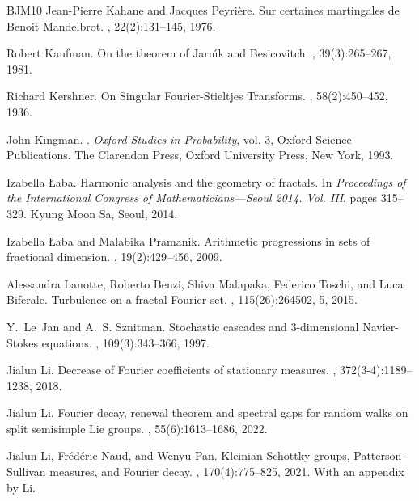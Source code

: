 \documentclass[12pt]{amsart}
\theoremstyle{definition}
\theoremstyle{remark}
\numberwithin{equation}{section}
\begin{document}
\begin{thebibliography}{BJM10}
	Jean-Pierre Kahane and Jacques Peyri\`ere.
	\newblock Sur certaines martingales de {B}enoit {M}andelbrot.
	, 22(2):131--145, 1976.
	
	
	Robert Kaufman.
	\newblock On the theorem of {J}arn\'{\i}k and {B}esicovitch.
	, 39(3):265--267, 1981.
	
	Richard Kershner.
	\newblock On {S}ingular {F}ourier-{S}tieltjes {T}ransforms.
	, 58(2):450--452, 1936.
	
	
	John Kingman. 
	. {\em Oxford Studies in Probability}, vol. 3, Oxford Science Publications. 
	\newblock 
	The Clarendon Press, Oxford University Press, New York, 1993.
	
	
	
	
	
	Izabella {\L}aba.
	\newblock Harmonic analysis and the geometry of fractals.
	\newblock In {\em Proceedings of the {I}nternational {C}ongress of
		{M}athematicians---{S}eoul 2014. {V}ol. {III}}, pages 315--329. Kyung Moon  Sa, Seoul, 2014.
	
	
	Izabella {\L}aba and Malabika Pramanik.
	\newblock Arithmetic progressions in sets of fractional dimension.
	, 19(2):429--456, 2009.
	
	
	Alessandra Lanotte, Roberto Benzi, Shiva Malapaka, Federico Toschi, and
	Luca Biferale.
	\newblock Turbulence on a fractal {F}ourier set.
	, 115(26):264502, 5, 2015.
	
	
	Y.~Le~Jan and A.~S. Sznitman.
	\newblock Stochastic cascades and {$3$}-dimensional {N}avier-{S}tokes
	equations.
	, 109(3):343--366, 1997.
	
	Jialun Li.
	\newblock Decrease of {F}ourier coefficients of stationary measures.
	, 372(3-4):1189--1238, 2018.
	
	Jialun Li.
	\newblock Fourier decay, renewal theorem and spectral gaps for random walks on
	split semisimple {L}ie groups.
	, 55(6):1613--1686, 2022.
	
	Jialun Li, Fr\'{e}d\'{e}ric Naud, and Wenyu Pan.
	\newblock Kleinian {S}chottky groups, {P}atterson-{S}ullivan measures, and
	{F}ourier decay.
	, 170(4):775--825, 2021.
	\newblock With an appendix by Li.
	

\end{thebibliography}
\end{document}
